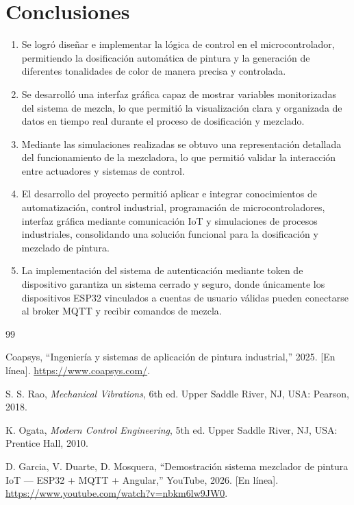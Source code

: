 \documentclass[conference]{IEEEtran}
\begin{document}
\section{Conclusiones}

\begin{enumerate}
    \item Se logr\'o dise\~nar e implementar la l\'ogica de control en el microcontrolador, permitiendo la dosificaci\'on autom\'atica de pintura y la generaci\'on de diferentes tonalidades de color de manera precisa y controlada.

    \item Se desarroll\'o una interfaz gr\'afica capaz de mostrar variables monitorizadas del sistema de mezcla, lo que permiti\'o la visualizaci\'on clara y organizada de datos en tiempo real durante el proceso de dosificaci\'on y mezclado.

    \item Mediante las simulaciones realizadas se obtuvo una representaci\'on detallada del funcionamiento de la mezcladora, lo que permiti\'o validar la interacci\'on entre actuadores y sistemas de control.

    \item El desarrollo del proyecto permiti\'o aplicar e integrar conocimientos de automatizaci\'on, control industrial, programaci\'on de microcontroladores, interfaz gr\'afica mediante comunicaci\'on IoT y simulaciones de procesos industriales, consolidando una soluci\'on funcional para la dosificaci\'on y mezclado de pintura.

    \item La implementaci\'on del sistema de autenticaci\'on mediante token de dispositivo garantiza un sistema cerrado y seguro, donde \'unicamente los dispositivos ESP32 vinculados a cuentas de usuario v\'alidas pueden conectarse al broker MQTT y recibir comandos de mezcla.
\end{enumerate}


\begin{thebibliography}{99}

Coapsys, ``Ingenier\'ia y sistemas de aplicaci\'on de pintura industrial,'' 2025. [En l\'inea]. \url{https://www.coapsys.com/}.

S. S. Rao, \textit{Mechanical Vibrations}, 6th ed. Upper Saddle River, NJ, USA: Pearson, 2018.

K. Ogata, \textit{Modern Control Engineering}, 5th ed. Upper Saddle River, NJ, USA: Prentice Hall, 2010.

D. Garcia, V. Duarte, D. Mosquera, ``Demostraci\'on sistema mezclador de pintura IoT --- ESP32 + MQTT + Angular,'' YouTube, 2026. [En l\'inea]. \url{https://www.youtube.com/watch?v=nbkm6lw9JW0}.

\end{thebibliography}
\end{document}

